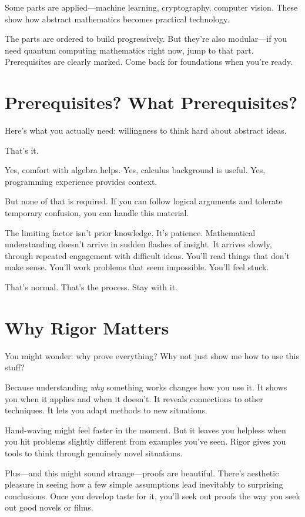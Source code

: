 Some parts are applied—machine learning, cryptography, computer vision. These show how abstract mathematics becomes practical technology.

The parts are ordered to build progressively. But they're also modular—if you need quantum computing mathematics right now, jump to that part. Prerequisites are clearly marked. Come back for foundations when you're ready.

\section*{Prerequisites? What Prerequisites?}

Here's what you actually need: willingness to think hard about abstract ideas.

That's it.

Yes, comfort with algebra helps. Yes, calculus background is useful. Yes, programming experience provides context.

But none of that is required. If you can follow logical arguments and tolerate temporary confusion, you can handle this material.

The limiting factor isn't prior knowledge. It's patience. Mathematical understanding doesn't arrive in sudden flashes of insight. It arrives slowly, through repeated engagement with difficult ideas. You'll read things that don't make sense. You'll work problems that seem impossible. You'll feel stuck.

That's normal. That's the process. Stay with it.

\section*{Why Rigor Matters}

You might wonder: why prove everything? Why not just show me how to use this stuff?

Because understanding \textit{why} something works changes how you use it. It shows you when it applies and when it doesn't. It reveals connections to other techniques. It lets you adapt methods to new situations.

Hand-waving might feel faster in the moment. But it leaves you helpless when you hit problems slightly different from examples you've seen. Rigor gives you tools to think through genuinely novel situations.

Plus—and this might sound strange—proofs are beautiful. There's aesthetic pleasure in seeing how a few simple assumptions lead inevitably to surprising conclusions. Once you develop taste for it, you'll seek out proofs the way you seek out good novels or films.

